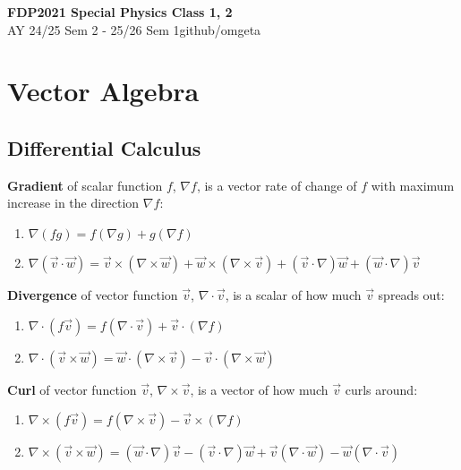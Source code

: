 \documentclass[12pt, a4paper]{article}
\newcommand{\mytitle}{FDP2021 Special Physics Class 1, 2}
\newcommand{\myauthor}{github/omgeta}
\newcommand{\mydate}{AY 24/25 Sem 2 - 25/26 Sem 1}
\begin{document}
\raggedright
\footnotesize
\begin{multicols*}{3}
\setlength{\premulticols}{1pt}
\setlength{\postmulticols}{1pt}
\setlength{\multicolsep}{1pt}
\setlength{\columnsep}{2pt}

{\normalsize{\textbf{\mytitle}}} \\
{\footnotesize{\mydate\hspace{2pt}\textemdash\hspace{2pt}\myauthor}}
\vspace{-0.8em}
\section{Vector Algebra}
\subsection{Differential Calculus}
\textbf{Gradient} of scalar function $f$, $\nabla f$, is a vector rate of change of $f$ with maximum increase in the direction $\nabla f$:
\begin{enumerate}[\roman*.]
  \item $\nabla(fg) = f(\nabla g) + g(\nabla f)$
  \item $\nabla (\vec{v} \cdot \vec{w}) = \vec{v} \times (\nabla \times \vec{w}) + \vec{w} \times (\nabla \times \vec{v}) + (\vec{v}\cdot\nabla)\vec{w} + (\vec{w}\cdot \nabla)\vec{v}$
\end{enumerate}

\textbf{Divergence} of vector function $\vec{v}$, $\nabla \cdot \vec{v}$, is a scalar of how much $\vec{v}$ spreads out:
\begin{enumerate}[\roman*.]
  \item $\nabla \cdot (f \vec{v}) = f(\nabla \cdot \vec{v}) + \vec{v}\cdot(\nabla f)$
  \item $\nabla \cdot (\vec{v} \times \vec{w}) = \vec{w}\cdot(\nabla\times \vec{v}) - \vec{v}\cdot(\nabla\times \vec{w})$
\end{enumerate}

\textbf{Curl} of vector function $\vec{v}$, $\nabla \times \vec{v}$, is a vector of how much $\vec{v}$ curls around:
\begin{enumerate}[\roman*.]
  \item $\nabla \times (f \vec{v}) = f(\nabla \times \vec{v}) - \vec{v} \times (\nabla f)$
  \item $\nabla \times (\vec{v}\times \vec{w}) = (\vec{w}\cdot\nabla)\vec{v} - (\vec{v}\cdot\nabla)\vec{w} + \vec{v}(\nabla\cdot \vec{w})- \vec{w}(\nabla\cdot \vec{v})$
\end{enumerate}


\end{multicols*}
\end{document}
